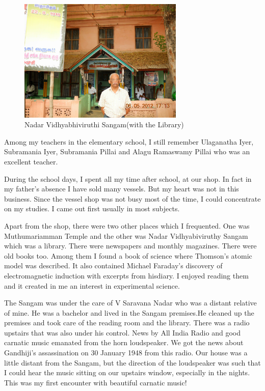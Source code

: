 \begin{figure}[H]
\centering
\includegraphics[width=0.7\textwidth]{images/new-images/03-Rajaji-lib.jpg}
\caption{Nadar Vidhyabhiviruthi Sangam\break (with the Library)}
\end{figure}
\medskip

Among my teachers in the elementary school, I still remember Ulaganatha
Iyer, Subramania Iyer, Subramania Pillai and Alagu Ramaswamy Pillai who
was an excellent teacher.

During the school days, I spent all my time after school, at our shop. 
In fact in my father's absence I have sold many vessels. But my heart was 
not in this business. Since the vessel shop was not busy most of the 
time, I could concentrate on my studies. I came out first usually in 
most subjects.

Apart from the shop, there were two other places which I frequen\-ted. One 
was Muthumariamman Temple and the other was Nadar Vidhyabiviruthy Sangam 
which was a library. There were newspapers and monthly magazines. There 
were old books too. Among them I found a book of science where Thomson's 
atomic model was described. It also contained Michael Faraday's\break 
discovery of electromagnetic induction with excerpts from his\break diary. I 
enjoyed reading them and it created in me an interest in experimental science.

The Sangam was under the care of V Saravana Nadar who was a distant 
relative of mine. He was a bachelor and lived in the Sangam premises.He 
cleaned up the premises and took care of the reading room and the 
library. There was a radio upstairs that was also under his control. 
News by All India Radio and good carnatic music emanated from the horn 
loudspeaker. We got the news about Gandhiji's assassination on 30 
January 1948 from this radio. Our house was a little distant from the 
Sangam, but the direction of the loudspeaker was such that I could hear 
the music sitting on our upstairs window, especially in the nights. 
This was my first encounter with beautiful carnatic music!

